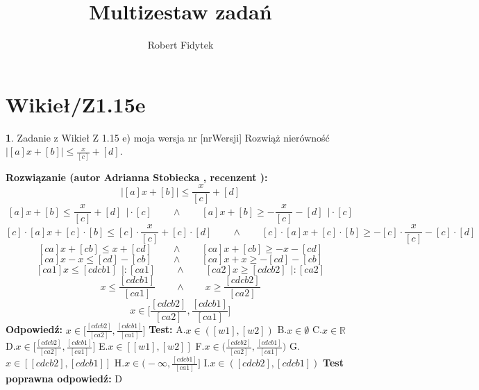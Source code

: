 \documentclass[12pt, a4paper]{article}
\title{Multizestaw zadań}
\author{Robert Fidytek}
\date{}
\theoremstyle{definition} %
\newtheorem{zad}{}
\newcommand{\kategoria}[1]{\section{#1}} %
\newcommand{\zadStart}[1]{\begin{zad}#1\newline} %
\newcommand{\zadStop}{\end{zad}}   %
\newcommand{\rozwStart}[2]{\noindent \textbf{Rozwiązanie (autor #1 , recenzent #2): }\newline} %
\newcommand{\rozwStop}{\newline}                                            %
\newcommand{\odpStart}{\noindent \textbf{Odpowiedź:}\newline}    %
\newcommand{\odpStop}{\newline}                                             %
\newcommand{\testStart}{\noindent \textbf{Test:}\newline} %
\newcommand{\testStop}{\newline} %
\newcommand{\kluczStart}{\noindent \textbf{Test poprawna odpowiedź:}\newline} %
\newcommand{\kluczStop}{\newline} %
\begin{document}
\maketitle


\kategoria{Wikieł/Z1.15e}
\zadStart{Zadanie z Wikieł Z 1.15 e) moja wersja nr [nrWersji]}
Rozwiąż nierówność $|[a]x+[b]|\leq\frac{x}{[c]}+[d]$.
\zadStop
\rozwStart{Adrianna Stobiecka}{}
$$|[a]x+[b]|\leq\frac{x}{[c]}+[d]$$
$$[a]x+[b]\leq\frac{x}{[c]}+[d]~~\bigg|\cdot[c]\qquad\land\qquad[a]x+[b]\geq-\frac{x}{[c]}-[d]~~\bigg|\cdot[c]$$
$$[c]\cdot[a]x+[c]\cdot[b]\leq[c]\cdot\frac{x}{[c]}+[c]\cdot[d]\qquad\land\qquad[c]\cdot[a]x+[c]\cdot[b]\geq-[c]\cdot\frac{x}{[c]}-[c]\cdot[d]$$
$$[ca]x+[cb]\leq x+[cd]\qquad\land\qquad[ca]x+[cb]\geq-x-[cd]$$
$$[ca]x-x\leq[cd]-[cb]\qquad\land\qquad[ca]x+x\geq-[cd]-[cb]$$
$$[ca1]x\leq[cdcb1]~~\bigg|:[ca1]\qquad\land\qquad[ca2]x\geq[cdcb2]~~\bigg|:[ca2]$$
$$x\leq\frac{[cdcb1]}{[ca1]}\qquad\land\qquad x\geq\frac{[cdcb2]}{[ca2]}$$
$$x\in\bigg[\frac{[cdcb2]}{[ca2]},\frac{[cdcb1]}{[ca1]}\bigg]$$
\rozwStop
\odpStart
$x\in\bigg[\frac{[cdcb2]}{[ca2]},\frac{[cdcb1]}{[ca1]}\bigg]$
\odpStop
\testStart
A.$x\in([w1],[w2])$
B.$x\in\emptyset$
C.$x\in\mathbb{R}$
D.$x\in\bigg[\frac{[cdcb2]}{[ca2]},\frac{[cdcb1]}{[ca1]}\bigg]$
E.$x\in[[w1],[w2]]$
F.$x\in\bigg(\frac{[cdcb2]}{[ca2]},\frac{[cdcb1]}{[ca1]}\bigg)$
G.$x\in[[cdcb2],[cdcb1]]$
H.$x\in\bigg(-\infty,\frac{[cdcb1]}{[ca1]}\bigg]$
I.$x\in([cdcb2],[cdcb1])$
\testStop
\kluczStart
D
\kluczStop
\end{document}
